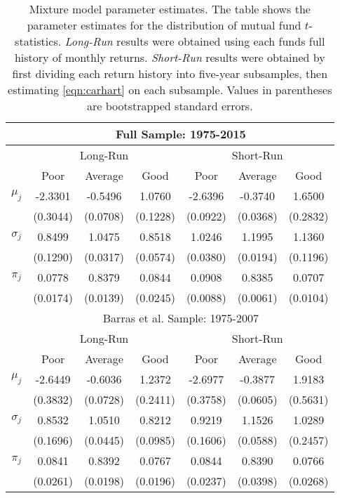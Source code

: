 		\begin{table}[p]
			\small
			\centering
			\begin{tabular}{*{7}{c}}
			\toprule
			& \multicolumn{6}{c}{Full Sample: 1975-2015} \\
			\midrule
			& \multicolumn{3}{c}{Long-Run} & \multicolumn{3}{c}{Short-Run} \\
			\cmidrule(l{2pt}r{2pt}){2-4} \cmidrule(l{2pt}r{2pt}){5-7}
			& Poor & Average & Good & Poor & Average & Good \\
			\midrule
			$\mu_j$ & -2.3301 & -0.5496 & 1.0760 & -2.6396 & -0.3740 & 1.6500 \\
			& (0.3044) & (0.0708) & (0.1228) & (0.0922) & (0.0368) & (0.2832) \\
			$\sigma_j$ & 0.8499 & 1.0475 & 0.8518 & 1.0246 & 1.1995 & 1.1360 \\
			& (0.1290) & (0.0317) & (0.0574) & (0.0380) & (0.0194) & (0.1196) \\
			$\pi_j$ & 0.0778 & 0.8379 & 0.0844 & 0.0908 & 0.8385 & 0.0707 \\
			& (0.0174) & (0.0139) & (0.0245) & (0.0088) & (0.0061) & (0.0104) \\
			\midrule
			& \multicolumn{6}{c}{Barras et al. Sample: 1975-2007} \\
			\midrule
			& \multicolumn{3}{c}{Long-Run} & \multicolumn{3}{c}{Short-Run} \\
			\cmidrule(l{2pt}r{2pt}){2-4} \cmidrule(l{2pt}r{2pt}){5-7}
			& Poor & Average & Good & Poor & Average & Good \\
			\midrule
			$\mu_j$ & -2.6449 & -0.6036 & 1.2372 & -2.6977 & -0.3877 & 1.9183 \\
			& (0.3832) & (0.0728) & (0.2411) & (0.3758) & (0.0605) & (0.5631) \\
			$\sigma_j$ & 0.8532 & 1.0510 & 0.8212 & 0.9219 & 1.1526 & 1.0289 \\
			& (0.1696) & (0.0445) & (0.0985) & (0.1606) & (0.0588) & (0.2457) \\
			$\pi_j$ & 0.0841 & 0.8392 & 0.0767 & 0.0844 & 0.8390 & 0.0766 \\
			& (0.0261) & (0.0198) & (0.0196) & (0.0237) & (0.0398) & (0.0268) \\
			\bottomrule
			\end{tabular}
			\captionsetup{position=below, font=footnotesize, justification=justified, width=0.77\linewidth}
			\caption[Mixture model parameter estimates]{Mixture model parameter estimates. The table shows the parameter estimates for the distribution of mutual fund $t$-statistics. \textit{Long-Run} results were obtained using each funds full history of monthly returns. \textit{Short-Run} results were obtained by first dividing each return history into five-year subsamples, then estimating \eqref{eqn:carhart} on each subsample. Values in parentheses are bootstrapped standard errors.}
			\label{tab:main}
		\end{table}

